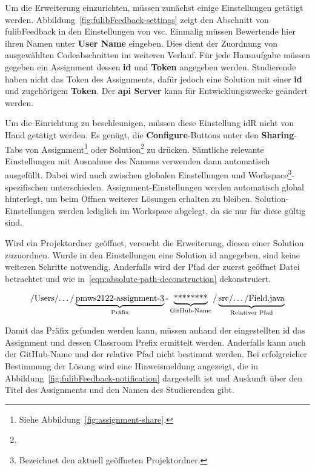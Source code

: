 Um die Erweiterung einzurichten, müssen zunächst einige Einstellungen getätigt werden.
Abbildung~\ref{fig:fulibFeedback-settings} zeigt den Abschnitt von fulibFeedback in den Einstellungen von \ac{vsc}.
Einmalig müssen Bewertende hier ihren Namen unter \textbf{User Name} eingeben.
Dies dient der Zuordnung von ausgewählten Codeabschnitten im weiteren Verlauf.
Für jede Hausaufgabe müssen gegeben ein Assignment dessen \textbf{\acs{id}} und \textbf{Token} angegeben werden.
Studierende haben nicht das Token des Assignments, dafür jedoch eine Solution mit einer \textbf{\acs{id}} und zugehörigem \textbf{Token}.
Der \textbf{\acs{api} Server} kann für Entwicklungszwecke geändert werden.

Um die Einrichtung zu beschleunigen, müssen diese Einstellung \ac{idR} nicht von Hand getätigt werden.
Es genügt, die \textbf{Configure}-Buttons unter den \textbf{Sharing}-Tabs von Assignment\footnote{
    Siehe Abbildung~\ref{fig:assignment-share}.
} oder Solution\footnote{
} zu drücken.
Sämtliche relevante Einstellungen mit Ausnahme des Namens verwenden dann automatisch ausgefüllt.
Dabei wird auch zwischen globalen Einstellungen und Workspace\footnote{
    Bezeichnet den aktuell geöffneten Projektordner.
}-spezifischen unterschieden.
Assignment-Einstellungen werden automatisch global hinterlegt, um beim Öffnen weiterer Lösungen erhalten zu bleiben.
Solution-Einstellungen werden lediglich im Workspace abgelegt, da sie nur für diese gültig sind.

Wird ein Projektordner geöffnet, versucht die Erweiterung, diesen einer Solution zuzuordnen.
Wurde in den Einstellungen eine Solution \acs{id} angegeben, sind keine weiteren Schritte notwendig.
Anderfalls wird der Pfad der zuerst geöffnet Datei betrachtet und wie in~\ref{eqn:absolute-path-deconstruction} dekonstruiert.

\begin{equation}\label{eqn:absolute-path-deconstruction}
    \text{/Users/\dots/}
    \underbrace{\text{pmws2122-assignment-3}}_{\text{Präfix}}
    \text{-}
    \underbrace{\text{********}}_{\text{GitHub-Name}}
    \text{/}
    \underbrace{\text{src/\dots/Field.java}}_{\text{Relativer Pfad}}
\end{equation}

Damit das Präfix gefunden werden kann, müssen anhand der eingestellten \acs{id} das Assignment und dessen Classroom Prefix ermittelt werden.
Anderfalls kann auch der GitHub-Name und der relative Pfad nicht bestimmt werden.
Bei erfolgreicher Bestimmung der Lösung wird eine Hinweismeldung angezeigt, die in Abbildung~\ref{fig:fulibFeedback-notification} dargestellt ist und Auskunft über den Titel des Assignments und den Namen des Studierenden gibt.

